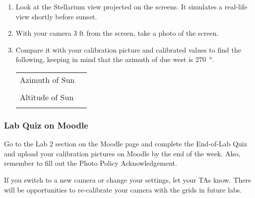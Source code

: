 \documentclass[main.tex]{subfiles}
\begin{document}
\begin{enumerate}
\item Look at the Stellarium view projected on the screens. It simulates a real-life view shortly before sunset.
\item With your camera 3 ft from the screen, take a photo of the screen.
\item Compare it with your calibration picture and calibrated values to find the following, keeping in mind that the azimuth of due west is \SI{270}{\degree}.
\begin{center}
\begin{tabular}{|p{3cm}|p{4cm}|}\hline
Azimuth of Sun & \\
&\\\hline
Altitude of Sun & \\
&\\\hline
\end{tabular}
\end{center}
\end{enumerate}

\subsubsection{Lab Quiz on Moodle}
Go to the Lab 2 section on the Moodle page and complete the End-of-Lab Quiz and upload your calibration pictures on Moodle by the end of the week. Also, remember to fill out the Photo Policy Acknowledgement.

If you switch to a new camera or change your settings, let your TAs know. There will be opportunities to re-calibrate your camera with the grids in future labs.
\end{document}
